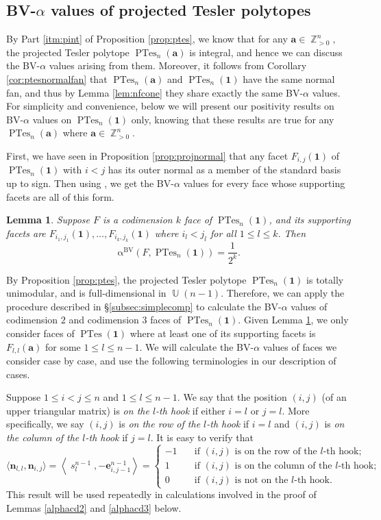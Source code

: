 \documentclass[12pt]{amsart}
\numberwithin{equation}{section}
\newtheorem{lem}[thm]{Lemma}
\theoremstyle{definition}
\def\ptes{\operatorname{PTes}}
\def\1{{\boldsymbol{1}}}
\def\ba{{\boldsymbol{a}}}
\def\be{{\boldsymbol{e}}}
\def\bn{\boldsymbol{n}}
\def\bvalpha{\operatorname{\alpha^{BV}}}
\def\sm{\boldsymbol{\operatorname{\mathit{s}}}}
\def\U{\operatorname{\mathbb{U}}}
\def\Z{\operatorname{\mathbb{Z}}}
\begin{document}
\subsection{BV-$\alpha$ values of projected Tesler polytopes} \label{subsec:bvptes}
By Part \eqref{itm:pint} of Proposition \ref{prop:ptes}, we know that for any $\ba \in \Z_{> 0}^n,$ the projected Tesler polytope $\ptes_n(\ba)$ is integral, and hence we can discuss the BV-$\alpha$ values arising from them. Moreover, it follows from Corollary \ref{cor:ptesnormalfan} that $\ptes_n(\ba)$ and $\ptes_n(\1)$ have the same normal fan, and thus by Lemma \ref{lem:nfcone} they share exactly the same BV-$\alpha$ values.  
For simplicity and convenience, below we will present our positivity results on BV-$\alpha$ values on $\ptes_n(\1)$ only, knowing that these results are true for any $\ptes_n(\ba)$ where $\ba \in \Z_{> 0}^n.$


First, we have seen in Proposition \ref{prop:projnormal} that any facet $F_{i,j}(\1)$ of $\ptes_n(\1)$ with $i<j$ has its outer normal as a member of the standard basis up to sign.
Then using \cite[Example 3.15]{Castillo2015v1}, we get the BV-$\alpha$ values for every face whose supporting facets are all of this form. 

\begin{lem} \label{cube}
	Suppose $F$ is a codimension $k$ face of $\ptes_{n}(\1)$, and its supporting facets are $F_{i_{1},j_{1}}(\1),\dots,F_{i_{k},j_{k}}(\1)$ where $i_{l}<j_{l}$ for all $1 \le l \le k.$ Then \[\bvalpha(F, \ptes_n(\1))=\dfrac{1}{2^k}.\]
\end{lem}

By Proposition \ref{prop:ptes}, the projected Tesler polytope $\ptes_{n}(\1)$ is totally unimodular, and is full-dimensional in $\U(n-1)$. Therefore, we can apply the procedure described in \S \ref{subsec:simplecomp} to calculate the BV-$\alpha$ values of codimension $2$ and codimension $3$ faces of $\ptes_{n}(\boldsymbol{1})$. 
Given Lemma \ref{cube}, we only consider faces of $\ptes(\1)$ where at least one of its supporting facets is $F_{l,l}(\ba)$ for some $1 \le l \le n-1$. We will calculate the BV-$\alpha$ values of faces we consider case by case, and use the following terminologies in our description of cases. 

Suppose $1 \le i < j \le n$ and $1 \le l \le n-1.$ We say that the position $(i,j)$ (of an upper triangular matrix) is \emph{on the $l$-th hook} if either $i=l$ or $j=l$. More specifically, we say $(i,j)$ is \emph{on the row of the $l$-th hook} if $i=l$ and $(i,j)$ is \emph{on the column of the $l$-th hook} if $j=l$. It is easy to verify that 
\[ \langle \bn_{l,l}, \bn_{i,j} \rangle =\left\langle \sm^{n-1}_{l}, -\be^{n-1}_{i,j-1} \right\rangle
  =\begin{cases}
    -1 & \quad \text{if $(i,j)$ is on the row of the $l$-th hook}; \\
    1 & \quad \text{if $(i,j)$ is on the column of the $l$-th hook}; \\
    0 & \quad \text{if $(i,j)$ is not on the $l$-th hook}.
  \end{cases}
\]
This result will be used repeatedly in calculations involved in the proof of Lemmas \ref{alphacd2} and \ref{alphacd3} below. 
\end{document}
